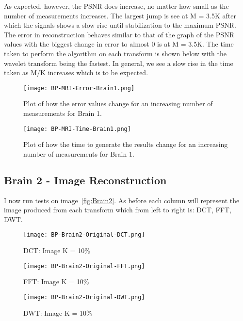 \documentclass[titlepage,oneside, 12pt]{book}
\theoremstyle{break}
\begin{document}
As expected, however, the PSNR does increase, no matter how small as the number of measurements increases. The largest jump is see at M = 3.5K after which the signals shows a slow rise until stabilization to the maximum PSNR. The error in reconstruction behaves similar to that of the graph of the PSNR values with the biggest change in error to almost 0 is at M = 3.5K. The time taken to perform the algorithm on each transform is shown below with the wavelet transform being the fastest. In general, we see a slow rise in the time taken as M/K increases which is to be expected. 


\begin{figure}[H]
\centering
\centerline{\texttt{[image: BP-MRI-Error-Brain1.png]}}
\caption{Plot of how the error values change for an increasing number of measurements for Brain 1.}
\label{fig:BP-MRI-Error-Brain1}
\end{figure}

\begin{figure}[H]
\centering
\centerline{\texttt{[image: BP-MRI-Time-Brain1.png]}}
\caption{Plot of how the time to generate the results change for an increasing number of measurements for Brain 1.}
\label{fig:BP-MRI-Time-Brain1}
\end{figure}

\clearpage


\subsection{Brain 2 - Image Reconstruction}

I now run tests on image~\ref{fig:Brain2}. As before each column will represent the image produced from each transform which from left to right is: DCT, FFT, DWT. 

\begin{figure}[!h]
\centering
{}
  \texttt{[image: BP-Brain2-Original-DCT.png]}
  \caption{DCT: Image K = 10\%}\label{fig:BP-Brain2-Original-DCT}
\endminipage
\hspace*{2em}
  \texttt{[image: BP-Brain2-Original-FFT.png]}
  \caption{FFT: Image K = 10\%}\label{fig:BP-Brain2-Original-FFT}
\endminipage
\hspace*{2em}
%
  \texttt{[image: BP-Brain2-Original-DWT.png]}
  \caption{DWT: Image K = 10\%}\label{fig:BP-Brain2-Original-DWT}
\endminipage
\hspace*{2em}
\end{figure}
\end{document}
